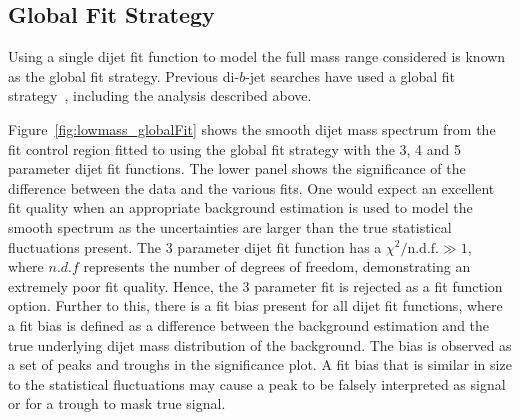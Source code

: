 


\subsection{Global Fit Strategy}
\label{sec:bkg-full_globalFit}

Using a single dijet fit function to model the full mass range considered is known as the global fit strategy.
Previous di-$b$-jet searches have used a global fit strategy~\cite{dibjet-mori16_paper}, including the \summer{} analysis described above.


Figure~\ref{fig:lowmass_globalFit} shows the smooth dijet mass spectrum from the fit control region
fitted to using the global fit strategy with the 3, 4 and 5 parameter dijet fit functions.
The lower panel shows the significance of the difference between the data and the various fits.
One would expect an excellent fit quality when an appropriate background estimation is used
to model the smooth spectrum as the uncertainties are larger than the true statistical fluctuations present.
The 3 parameter dijet fit function has a $\chi^{2}/\text{n.d.f.} \gg 1$,
where $n.d.f$ represents the number of degrees of freedom, demonstrating an extremely poor fit quality.
Hence, the 3 parameter fit is rejected as a fit function option.
Further to this, there is a fit bias present for all dijet fit functions,
where a fit bias is defined as a difference between the background estimation and the true underlying dijet mass distribution of the background.
The bias is observed as a set of peaks and troughs in the significance plot.
A fit bias that is similar in size to the statistical fluctuations
may cause a peak to be falsely interpreted as signal or for a trough to mask true signal.

